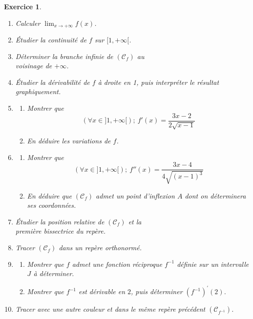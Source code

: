 \documentclass[12pt,a4paper]{article}
\newcommand{\Lim}{\displaystyle\lim}
\theoremstyle{mystyle}
\newtheorem{exo}{Exercice}
\begin{document}
\begin{multicols*}{2}
\begin{exo}
\begin{enumerate}
    \item Calculer $\Lim_{x \to +\infty} f(x)$.
    \item Étudier la continuité de $f$ sur $[1,+\infty[$.
    \item Déterminer la branche infinie de $(\mathcal{C}_f)$ au \\ voisinage de $+\infty$.
    \item Étudier la dérivabilité de $f$ à droite en 1, puis interpréter le résultat graphiquement.
    \item 
    \begin{enumerate}
        \item Montrer que $$(\forall x \in ]1,+\infty[); \ f'(x) = \frac{3x-2}{2\sqrt{x-1}}$$
        \item En déduire les variations de $f$.
    \end{enumerate}
    \item 
    \begin{enumerate}
        \item Montrer que $$(\forall x \in ]1,+\infty[); \ f''(x) = \frac{3x-4}{4\sqrt{(x-1)^3}}$$
        \item En déduire que $(\mathcal{C}_f)$ admet un point d’inflexion $A$ dont on déterminera ses coordonnées.
    \end{enumerate}
    \item Étudier la position relative de $(\mathcal{C}_f)$ et la \\première bissectrice du repère.
    \item Tracer $(\mathcal{C}_f)$ dans un repère orthonormé.
    \item 
    		\begin{enumerate}
    			\item Montrer que $f$ admet une fonction réciproque $f^{-1}$ définie sur un intervalle $J$ à déterminer.
    			\item Montrer que $f^{-1}$ est dérivable en $2$, puis déterminer $\left(f^{-1}\right)^{\prime}(2)$.
    		\end{enumerate}
    	\item Tracer avec une autre couleur et dans le même repère précédent $(\mathcal{C}_{f^{-1}})$.
\end{enumerate}

\end{exo}




\end{multicols*}
\end{document}

